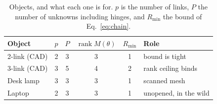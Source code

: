 \begin{table}[t]
\caption{Objects, and what each one is for. $p$ is the number of links, $P$ the
number of unknowns including hinges, and $R_{\min}$ the bound of
Eq.~\eqref{eq:chain}.}
\label{tab:objects}
\centering
\begin{tabular}{lccccl}
\hline
Object & $p$ & $P$ & $\operatorname{rank}M(\theta)$ & $R_{\min}$ & Role \\
\hline
2-link (CAD)  & 2 & 3 & 3 & 1 & bound is tight \\
3-link (CAD)  & 3 & 5 & 4 & 2 & rank ceiling binds \\
Desk lamp     & 3 & 3 & 3 & 1 & scanned mesh \\
Laptop        & 2 & 3 & 3 & 1 & unopened, in the wild \\
\hline
\end{tabular}
\end{table}

